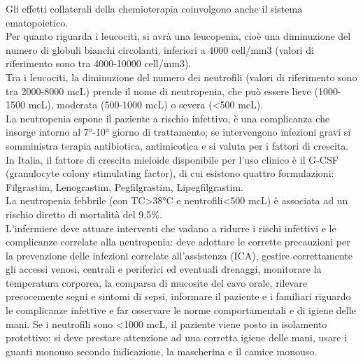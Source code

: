Gli effetti collaterali della chemioterapia coinvolgono anche il sistema ematopoietico.\\
Per quanto riguarda i leucociti, si avrà una leucopenia, cioè una diminuzione del numero di globuli bianchi 
circolanti, inferiori a 4000 cell/mm3 (valori di riferimento sono tra 4000-10000 cell/mm3).\\ 
Tra i leucociti, la diminuzione del numero dei neutrofili (valori di riferimento sono tra 2000-8000 mcL) 
prende il nome di neutropenia, che può essere lieve (1000-1500 mcL), moderata (500-1000 mcL) o severa (<500 mcL).\\ 
La neutropenia espone il paziente a rischio infettivo, è una complicanza che insorge intorno al 7°-10° giorno di 
trattamento; se intervengono infezioni gravi si somministra terapia antibiotica, antimicotica e si valuta per i 
fattori di crescita\cite{AIOMTOSS}. In Italia, il fattore di crescita mieloide disponibile per l’uso clinico 
è il G-CSF (granulocyte colony stimulating factor), di cui esistono quattro formulazioni: 
Filgrastim, Lenograstim, Pegfilgrastim, Lipegfilgrastim\cite{AIOMTOSS}.\\
La neutropenia febbrile (con TC>38°C e neutrofili<500 mcL) è associata ad un rischio diretto di mortalità del 9,5\%.\\ 
L’infermiere deve attuare interventi che vadano a ridurre i rischi infettivi e le complicanze correlate alla 
neutropenia: deve adottare le corrette precauzioni per la prevenzione delle infezioni correlate all’assistenza (ICA), 
gestire correttamente gli accessi venosi, centrali e periferici ed eventuali drenaggi, monitorare la temperatura 
corporea, la comparsa di mucosite del cavo orale, rilevare precocemente segni e sintomi di sepsi, informare il 
paziente e i familiari riguardo le complicanze infettive e far osservare le norme comportamentali e di igiene delle mani. 
Se i neutrofili sono <1000 mcL, il paziente viene posto in isolamento protettivo: si deve prestare attenzione 
ad una corretta igiene delle mani, usare i guanti monouso secondo indicazione, la mascherina e il camice monouso\cite{ISOLAMENTO}.\\

